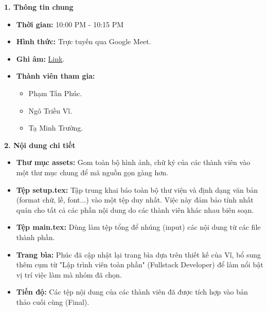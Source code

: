 \documentclass[12pt,a4paper]{article}
\begin{document}
\textbf{1. Thông tin chung}
\begin{itemize}
    \item \textbf{Thời gian:} 10:00 PM - 10:15 PM
    \item \textbf{Hình thức:} Trực tuyến qua Google Meet.
    \item \textbf{Ghi âm:} \href{https://drive.google.com/file/d/1rIhYs8GHVavb09OaW6-tkg5X1ZQh_Qsm}{Link}.
    \item \textbf{Thành viên tham gia:}
    \begin{itemize}
        \item Phạm Tấn Phúc.
        \item Ngô Triều Vĩ.
        \item Tạ Minh Trường.
    \end{itemize}
\end{itemize}

\textbf{2. Nội dung chi tiết}

\begin{itemize}[leftmargin=3.3em]
    \item[o] \textbf{Thư mục assets:} Gom toàn bộ hình ảnh, chữ ký của các thành viên vào một thư mục chung để mã nguồn gọn gàng hơn.
    \item[o] \textbf{Tệp setup.tex:} Tập trung khai báo toàn bộ thư viện và định dạng văn bản (format chữ, lề, font...) vào một tệp duy nhất. Việc này đảm bảo tính nhất quán cho tất cả các phần nội dung do các thành viên khác nhau biên soạn.
    \item[o] \textbf{Tệp main.tex:} Dùng làm tệp tổng để nhúng (input) các nội dung từ các file thành phần.
\end{itemize}

\begin{itemize}[leftmargin=3.3em]
    \item[o] \textbf{Trang bìa:} Phúc đã cập nhật lại trang bìa dựa trên thiết kế của Vĩ, bổ sung thêm cụm từ "Lập trình viên toàn phần" (Fullstack Developer) để làm nổi bật vị trí việc làm mà nhóm đã chọn.
    \item[o] \textbf{Tiến độ:} Các tệp nội dung của các thành viên đã được tích hợp vào bản thảo cuối cùng (Final).
\end{itemize}
\end{document}
